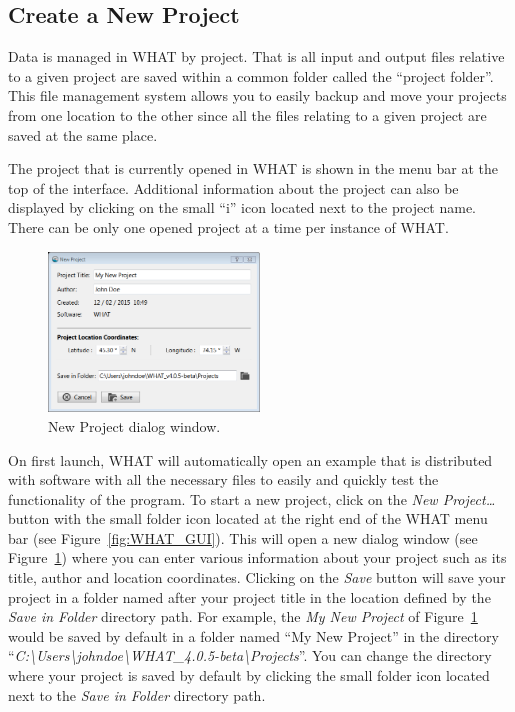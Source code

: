 \documentclass[12pt, letterpaper, fleqn]{report}
\begin{document}
\subsection{Create a New Project}

Data is managed in WHAT by project. That is all input and output files relative to a given project are saved within a common folder called the ``project folder''. This file management system allows you to easily backup and move your projects from one location to the other since all the files relating to a given project are saved at the same place.

The project that is currently opened in WHAT is shown in the menu bar at the top of the interface. Additional information about the project can also be displayed by clicking on the small ``i'' icon located next to the project name. There can be only one opened project at a time per instance of WHAT.

\begin{figure}[h!]
\centering
\includegraphics[width=0.5\textwidth]{WHAT_Screenshot_newproject}
\caption[New Project dialog window.]{New Project dialog window.}
\label{fig:new_proj_win}
\end{figure}

On first launch, WHAT will automatically open an example that is distributed with software with all the necessary files to easily and quickly test the functionality of the program. To start a new project, click on the \textsl{New Project\dots} button with the small folder icon located at the right end of the WHAT menu bar (see Figure~\ref{fig:WHAT_GUI}). This will open a new dialog window (see Figure~\ref{fig:new_proj_win}) where you can enter various information about your project such as its title, author and location coordinates. Clicking on the \textsl{Save} button will save your project in a folder named after your project title in the location defined by the \textsl{Save in Folder} directory path. For example, the \textsl{My New Project} of Figure~\ref{fig:new_proj_win} would be saved by default in a folder named ``My New Project'' in the directory ``\textsl{C:\textbackslash{}Users\textbackslash{}johndoe\textbackslash{}WHAT\_4.0.5-beta\textbackslash{}Projects}''. You can change the directory where your project is saved by default by clicking the small folder icon located next to the \textsl{Save in Folder} directory path.
\end{document}
